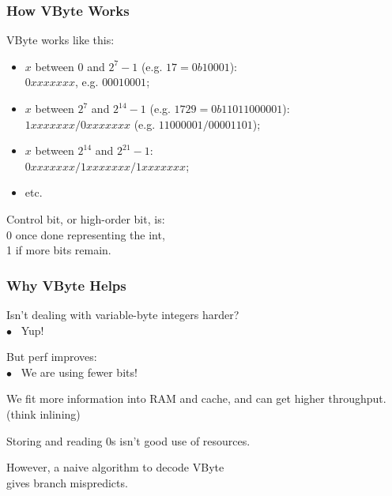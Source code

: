 \begin{frame}
\frametitle{How VByte Works}

\begin{changemargin}{1cm}
VByte works like this:

\begin{itemize}
\item $x$ between 0 and $2^7-1$ (e.g. $17 = 0b10001$):\\
\hspace*{1em}$0xxx xxxx$, e.g. $0001 0001$;
\item $x$ between $2^7$ and $2^{14}-1$ (e.g. $1729 = 0b110 11000001$):\\
\hspace*{1em}                   $1xxx xxxx/0xxx xxxx$ (e.g. $1100 0001/0000 1101$);\\
\item $x$ between $2^{14}$ and $2^{21}-1$: \\
\hspace*{1em}$0xxx xxxx/1xxx xxxx/1xxx xxxx$;
\item etc.
\end{itemize}

Control bit, or high-order bit, is:\\
\hspace*{2em}0 once done representing the int,\\
\hspace*{2em}1 if more bits remain.
\end{changemargin}

\end{frame}



\begin{frame}
\frametitle{Why VByte Helps}

\begin{changemargin}{2cm}
Isn't dealing with variable-byte integers harder?\\
\hspace*{2em} $\bullet$~ Yup!

But perf improves: \\
\hspace*{2em} $\bullet$~  We are using fewer bits! 

We fit more information into RAM and
cache, and can get higher throughput. (think inlining)

Storing and reading 0s isn't good use of resources. 

However, a naive algorithm to decode VByte \\
gives branch mispredicts.
\end{changemargin}
\end{frame}

